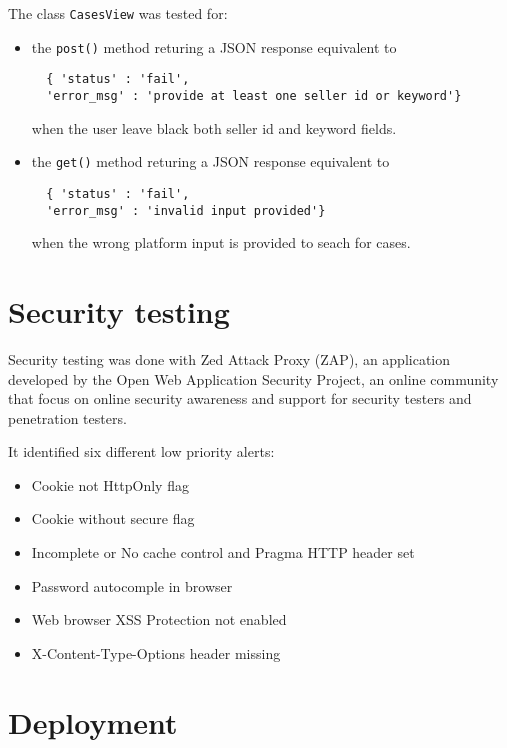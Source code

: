 The class \texttt{CasesView} was tested for:
\begin{itemize}
  \item the \texttt{post()} method returing a JSON response equivalent to
  \begin{verbatim}
  { 'status' : 'fail',
  'error_msg' : 'provide at least one seller id or keyword'} \end{verbatim} when
  the user leave black both seller id and keyword fields.
  \item the \texttt{get()} method returing a JSON response equivalent to
  \begin{verbatim}
  { 'status' : 'fail',
  'error_msg' : 'invalid input provided'} \end{verbatim} when the wrong platform
  input is provided to seach for cases.
\end{itemize}


\section{Security testing}
Security testing was done with Zed Attack Proxy (ZAP), an application developed
by the Open Web Application Security Project, an online community that focus on
online security awareness and support for security testers and penetration
testers.

It identified six different low priority alerts:
\begin{itemize}
  \item Cookie not HttpOnly flag
  \item Cookie without secure flag
  \item Incomplete or No cache control and Pragma HTTP header set
  \item Password autocomple in browser
  \item Web browser XSS Protection not enabled
  \item X-Content-Type-Options header missing
\end{itemize}


\section{Deployment}
